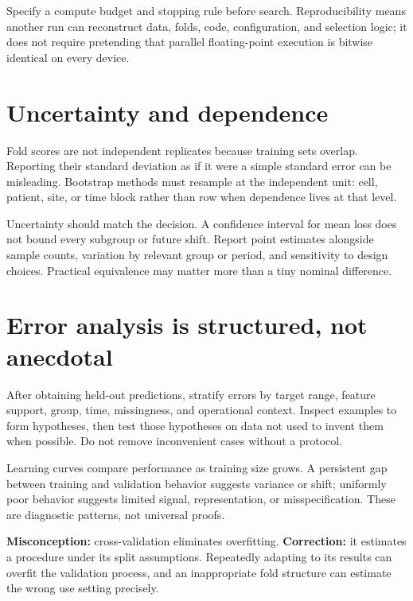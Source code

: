 \begin{professionalbox}
Specify a compute budget and stopping rule before search. Reproducibility means
another run can reconstruct data, folds, code, configuration, and selection
logic; it does not require pretending that parallel floating-point execution is
bitwise identical on every device.
\end{professionalbox}

\section{Uncertainty and dependence}

Fold scores are not independent replicates because training sets overlap.
Reporting their standard deviation as if it were a simple standard error can be
misleading. Bootstrap methods must resample at the independent unit: cell,
patient, site, or time block rather than row when dependence lives at that level.

Uncertainty should match the decision. A confidence interval for mean loss does
not bound every subgroup or future shift. Report point estimates alongside
sample counts, variation by relevant group or period, and sensitivity to design
choices. Practical equivalence may matter more than a tiny nominal difference.

\section{Error analysis is structured, not anecdotal}

After obtaining held-out predictions, stratify errors by target range, feature
support, group, time, missingness, and operational context. Inspect examples to
form hypotheses, then test those hypotheses on data not used to invent them when
possible. Do not remove inconvenient cases without a protocol.

Learning curves compare performance as training size grows. A persistent gap
between training and validation behavior suggests variance or shift; uniformly
poor behavior suggests limited signal, representation, or misspecification.
These are diagnostic patterns, not universal proofs.

\begin{misconceptionbox}
\textbf{Misconception:} cross-validation eliminates overfitting. 
\textbf{Correction:} it estimates a procedure under its split assumptions.
Repeatedly adapting to its results can overfit the validation process, and an
inappropriate fold structure can estimate the wrong use setting precisely.
\end{misconceptionbox}

